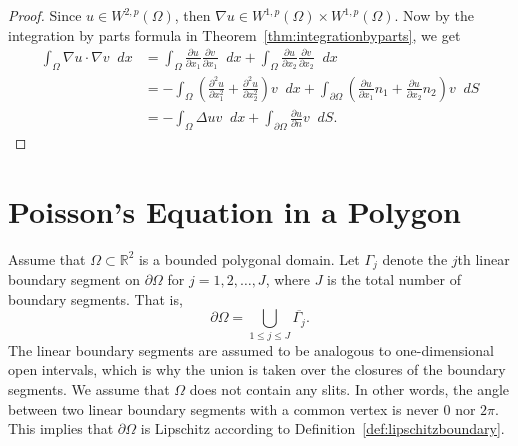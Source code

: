 \documentclass[english, 12pt, a4paper, sci, utf8, a-2b, online]{aaltothesis}
\theoremstyle{definition}
\theoremstyle{plain}
\newcommand*\diff{\mathop{}\!d}
\numberwithin{equation}{section}
\begin{document}
\begin{proof}
    Since $u \in W^{2,p}(\Omega)$, then
    $\nabla u \in W^{1,p}(\Omega) \times W^{1,p}(\Omega)$.
    Now by the integration by parts formula in
    Theorem~\ref{thm:integrationbyparts}, we get
    \begin{align*}
        \int_{\Omega} \nabla u \cdot \nabla v \diff x
        &= \int_{\Omega} \frac{\partial u}{\partial x_1}
            \frac{\partial v}{\partial x_1} \diff x
            + \int_{\Omega} \frac{\partial u}{\partial x_2}
            \frac{\partial v}{\partial x_2} \diff x \\
        &= -\int_{\Omega} \left( 
            \frac{\partial^2 u}{\partial x_1^2}
                + \frac{\partial^2 u}{\partial x_2^2} \right) v \diff x
            + \int_{\partial \Omega} \left(
                \frac{\partial u}{\partial x_1} n_1
                    + \frac{\partial u}{\partial x_2} n_2 \right) v \diff S \\
        &= -\int_{\Omega} \Delta u v \diff x
            + \int_{\partial \Omega} \frac{\partial u}{\partial n} v \diff S.
    \end{align*}
\end{proof}

\clearpage

\section{Poisson's Equation in a Polygon}
\label{sec:poissons_equation_in_a_polygon}

Assume that $\Omega \subset \mathbb{R}^2$ is a bounded polygonal domain.
Let $\Gamma_j$ denote the $j$th linear boundary segment on $\partial \Omega$
for $j = 1,2,\dotsc,J$, where $J$ is the total number of boundary segments.
That is,
\begin{equation*}
    \partial \Omega = \bigcup_{1 \leq j \leq J} \overline{\Gamma_j}.
\end{equation*}
The linear boundary segments are assumed to be analogous to one-dimensional
open intervals, which is why the union is taken over the closures of the
boundary segments. We assume that $\Omega$ does not contain any slits.
In other words, the angle between two linear boundary segments with a common vertex
is never $0$ nor $2\pi$.
This implies that $\partial \Omega$ is Lipschitz according to
Definition~\ref{def:lipschitzboundary}.
\end{document}
